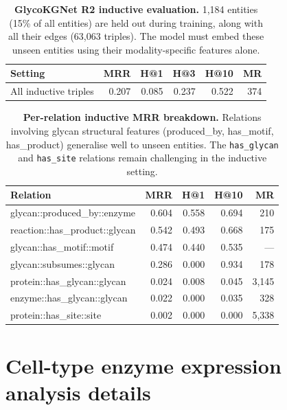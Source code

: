 \documentclass[11pt,a4paper]{article}
\begin{document}
\begin{table}[H]
\centering
\caption{\textbf{GlycoKGNet R2 inductive evaluation.} 1,184 entities (15\% of
all entities) are held out during training, along with all their edges (63,063
triples). The model must embed these unseen entities using their
modality-specific features alone.}
\label{tab:inductive}
\small
\begin{tabular}{lrrrrr}
\toprule
\textbf{Setting} & \textbf{MRR} & \textbf{H@1} & \textbf{H@3} & \textbf{H@10} & \textbf{MR} \\
\midrule
All inductive triples & 0.207 & 0.085 & 0.237 & 0.522 & 374 \\
\bottomrule
\end{tabular}
\end{table}

\begin{table}[H]
\centering
\caption{\textbf{Per-relation inductive MRR breakdown.} Relations involving
glycan structural features (produced\_by, has\_motif, has\_product) generalise
well to unseen entities. The \texttt{has\_glycan} and \texttt{has\_site}
relations remain challenging in the inductive setting.}
\label{tab:inductive_per_relation}
\small
\begin{tabular}{lrrrr}
\toprule
\textbf{Relation} & \textbf{MRR} & \textbf{H@1} & \textbf{H@10} & \textbf{MR} \\
\midrule
glycan::produced\_by::enzyme    & 0.604 & 0.558 & 0.694 & 210 \\
reaction::has\_product::glycan  & 0.542 & 0.493 & 0.668 & 175 \\
glycan::has\_motif::motif       & 0.474 & 0.440 & 0.535 & --- \\
glycan::subsumes::glycan        & 0.286 & 0.000 & 0.934 & 178 \\
\midrule
protein::has\_glycan::glycan    & 0.024 & 0.008 & 0.045 & 3,145 \\
enzyme::has\_glycan::glycan     & 0.022 & 0.000 & 0.035 & 328 \\
protein::has\_site::site        & 0.002 & 0.000 & 0.000 & 5,338 \\
\bottomrule
\end{tabular}
\end{table}

\section{Cell-type enzyme expression analysis details}
\label{sec:celltype_details}
\end{document}
